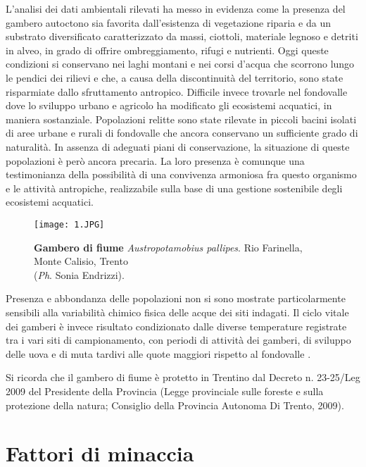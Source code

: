 \documentclass[10pt,twoside,openany,x11names,svgnames,italian,a5paper,dvipsnames,table]{memoir}
\newcommand\chapterillustration{}
\newcommand{\ph}{\emph{Ph}. }
\begin{document}
L’analisi dei dati ambientali rilevati ha messo in evidenza come la presenza del gambero autoctono sia favorita dall’esistenza di vegetazione riparia e da un substrato diversificato caratterizzato da massi, ciottoli, materiale legnoso e detriti in alveo, in grado di offrire ombreggiamento, rifugi e nutrienti. Oggi queste condizioni si conservano nei laghi montani e nei corsi d'acqua che scorrono lungo le pendici dei rilievi e che, a causa della discontinuità del territorio, sono state risparmiate dallo sfruttamento antropico. Difficile invece trovarle nel fondovalle dove lo sviluppo urbano e agricolo ha modificato gli ecosistemi acquatici, in maniera sostanziale. Popolazioni relitte sono state rilevate in piccoli bacini isolati di aree urbane e rurali di fondovalle che ancora conservano un sufficiente grado di naturalità. In assenza di adeguati piani di conservazione, la situazione di queste popolazioni è però ancora precaria. La loro presenza è comunque una testimonianza della possibilità di una convivenza armoniosa fra questo organismo e le attività antropiche, realizzabile sulla base di una gestione sostenibile degli ecosistemi acquatici.
\begin{wrapfigure}[16]{l}{.6\textwidth}
\texttt{[image: 1.JPG]}
\caption*{\textbf{Gambero di fiume} \emph{Austropotamobius pallipes}. Rio Farinella, Monte Calisio, Trento \\ (\ph Sonia Endrizzi).}
\end{wrapfigure}
Presenza e abbondanza delle popolazioni non si sono mostrate particolarmente sensibili alla variabilità chimico fisica delle acque dei siti indagati.  Il ciclo vitale dei gamberi è invece risultato condizionato dalle diverse temperature registrate tra i vari siti di campionamento, con periodi di attività dei gamberi, di sviluppo delle uova e di muta tardivi alle quote maggiori rispetto al fondovalle \cite{Endrizzi13a}. 

Si ricorda che il gambero di fiume è protetto in Trentino dal Decreto n. 23-25/Leg 2009 del Presidente della Provincia (Legge provinciale sulle foreste e sulla protezione della natura; Consiglio della Provincia Autonoma Di Trento, 2009).



\chapter{Fattori di minaccia}
\renewcommand\chapterillustration{5.jpg}
\end{document}
